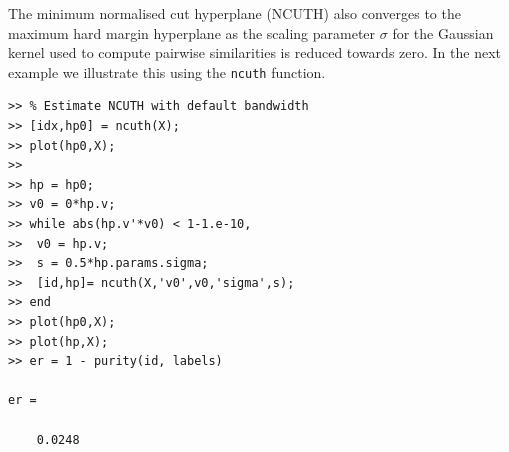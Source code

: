 \documentclass{book}
\begin{document}
The minimum normalised cut hyperplane (NCUTH) also
converges to the maximum hard margin hyperplane
as the scaling parameter $\sigma$
for the Gaussian kernel used to compute pairwise similarities is reduced
towards zero. In the next example we illustrate this using the
{\tt ncuth} function.

\begin{verbatim}
>> % Estimate NCUTH with default bandwidth
>> [idx,hp0] = ncuth(X);
>> plot(hp0,X);
>> 
>> hp = hp0;
>> v0 = 0*hp.v;
>> while abs(hp.v'*v0) < 1-1.e-10,
>> 	v0 = hp.v;
>> 	s = 0.5*hp.params.sigma;
>> 	[id,hp]= ncuth(X,'v0',v0,'sigma',s);
>> end
>> plot(hp0,X);
>> plot(hp,X);
>> er = 1 - purity(id, labels)

er =

    0.0248

\end{verbatim}
\end{document}
